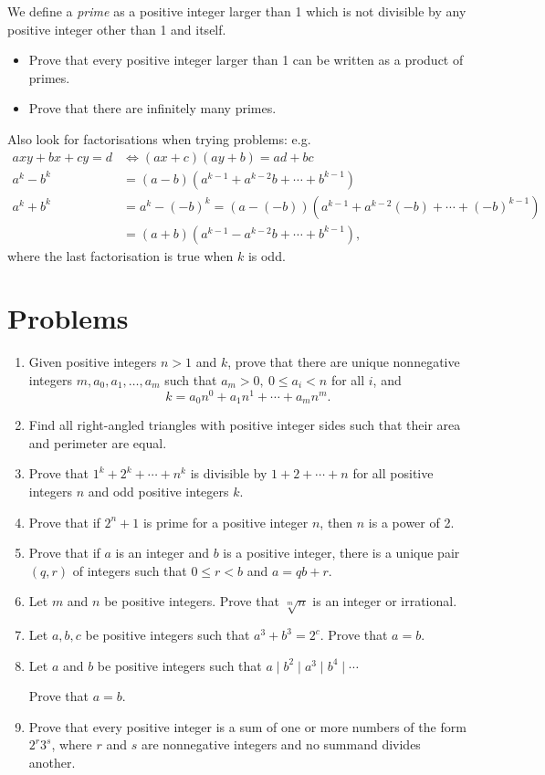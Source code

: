 \documentclass{article}
\begin{document}
  We define a \emph{prime} as a positive integer larger than 1 which is not
  divisible by any positive integer other than 1 and itself.
  \begin{itemize}
    \item Prove that every positive integer larger than 1 can be written as a
      product of primes.
    \item Prove that there are infinitely many primes.
  \end{itemize}
Also look for factorisations when trying problems: e.g.
\begin{align*}
  axy+bx+cy=d&\iff (ax+c)(ay+b)=ad+bc \\
  a^k-b^k&=(a-b)\left(a^{k-1}+a^{k-2}b+\cdots+b^{k-1}\right) \\
  a^k+b^k&=a^k-(-b)^k=(a-(-b))(a^{k-1}+a^{k-2}(-b)+\cdots+(-b)^{k-1}) \\
  &=(a+b)(a^{k-1}-a^{k-2}b+\cdots+b^{k-1}),
\end{align*}
where the last factorisation is true when $k$ is odd.
\section{Problems}
  \begin{enumerate}
    \item Given positive integers $n>1$ and $k$, prove that there are unique
      nonnegative integers $m,a_0,a_1,\ldots,a_m$ such that $a_m>0,\ 0\le
      a_i<n$ for all $i$, and
      \[k=a_0 n^0+a_1 n^1+\cdots+a_m n^m.\]
    \item Find all right-angled triangles with positive integer sides 
      such that their area and perimeter are equal.
    \item Prove that $1^k+2^k+\cdots+n^k$ is divisible by $1+2+\cdots+n$ for
      all positive integers $n$ and odd positive integers $k$.
    \item Prove that if $2^n+1$ is prime for a positive integer $n$, then $n$ is
      a power of 2.
    \item Prove that if $a$ is an integer and $b$ is a positive integer, there
      is a unique pair $(q,r)$ of integers such that $0\le r<b$ and $a=qb+r$.
    \item Let $m$ and $n$ be positive integers. Prove that $\sqrt[m]n$ is an
      integer or irrational.
    \item Let $a,b,c$ be positive integers such that $a^3+b^3=2^c$. Prove that
      $a=b$.
    \item Let $a$ and $b$ be positive integers such that $a\mid b^2\mid a^3\mid
      b^4\mid\cdots$

      Prove that $a=b$.
    \item Prove that every positive integer is a sum of one or more numbers of
      the form $2^r3^s$, where $r$ and $s$ are nonnegative integers and no
      summand divides another.
  \end{enumerate}
\newpage
\end{document}
